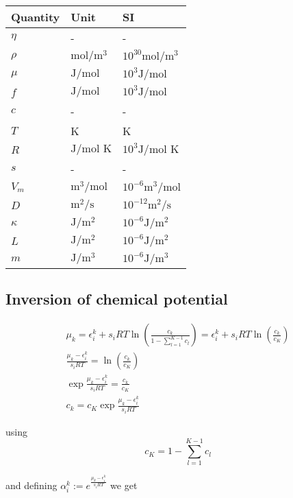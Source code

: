 \documentclass[11pt]{article}
\begin{document}
\begin{center}
\begin{tabular}{lll}
Quantity & Unit & SI\\[0pt]
\hline
\(\eta\) & - & -\\[0pt]
\(\rho\) & \(\text{mol}/\text{m}^3\) & \(10^{30} \text{mol}/\text{m}^3\)\\[0pt]
\(\mu\) & \(\text{J}/\text{mol}\) & \(10^3 \text{J}/\text{mol}\)\\[0pt]
\(f\) & \(\text{J}/\text{mol}\) & \(10^3 \text{J}/\text{mol}\)\\[0pt]
\(c\) & - & -\\[0pt]
\(T\) & K & K\\[0pt]
\(R\) & \(\text{J}/\text{mol K}\) & \(10^3 \text{J}/\text{mol K}\)\\[0pt]
\(s\) & - & -\\[0pt]
\(V_m\) & \(\text{m}^3/\text{mol}\) & \(10^{-6} \text{m}^3/\text{mol}\)\\[0pt]
\(D\) & \(\text{m}^2/\text{s}\) & \(10^{-12} \text{m}^2/\text{s}\)\\[0pt]
\(\kappa\) & \(\text{J}/\text{m}^2\) & \(10^{-6} \text{J}/\text{m}^2\)\\[0pt]
\(L\) & \(\text{J}/\text{m}^2\) & \(10^{-6} \text{J}/\text{m}^2\)\\[0pt]
\(m\) & \(\text{J}/\text{m}^3\) & \(10^{-6} \text{J}/\text{m}^3\)\\[0pt]
\end{tabular}
\end{center}


\subsection{Inversion of chemical potential}
\label{sec:orgb736cca}

\begin{align*}
\mu_k = \epsilon_i^k + s_i R T \ln{\left(\frac{c_k}{1-\sum_{l=1}^{K-1} c_l}\right)} = \epsilon_i^k + s_i R T \ln{\left(\frac{c_k}{c_K}\right)} \\
\frac{\mu_k - \epsilon_i^k}{s_i R T} = \ln{\left(\frac{c_k}{c_K}\right)} \\
\exp{\frac{\mu_k - \epsilon_i^k}{s_i R T}} = \frac{c_k}{c_K} \\
c_k = c_K \exp{\frac{\mu_k - \epsilon_i^k}{s_i R T}}
\end{align*}

using 
$$
c_K = 1 - \sum_{l=1}^{K-1} c_l
$$

and defining \(\alpha_i^k := e^{\frac{\mu_k - \epsilon_i^k}{s_i R T}}\) we get
\end{document}
